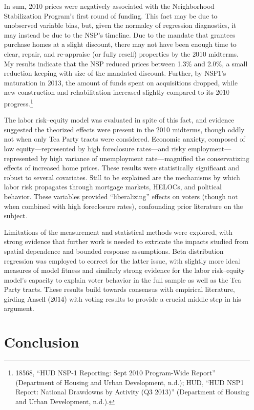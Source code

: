 \documentclass[12pt,oneside]{psthesis}
\begin{document}
In sum, 2010 prices were negatively associated with the Neighborhood Stabilization Program's first round of funding.
This fact may be due to unobserved variable bias, but, given the normalcy of regression diagnostics, it may instead be due to the NSP's timeline.
Due to the mandate that grantees purchase homes at a slight discount, there may not have been enough time to clear, repair, and re-appraise (or fully resell) properties by the 2010 midterms.
My results indicate that the NSP reduced prices between 1.3\% and 2.0\%, a small reduction keeping with size of the mandated discount.
Further, by NSP1's maturation in 2013, the amount of funds spent on acquisitions dropped, while new construction and rehabilitation increased slightly compared to its 2010 progress.\footnote{18568, ``HUD NSP-1 Reporting: Sept 2010 Program-Wide Report'' (Department of Housing and Urban Development, n.d.); HUD, ``HUD NSP1 Report: National Drawdowns by Activity (Q3 2013)'' (Department of Housing and Urban Development, n.d.).}

The labor risk--equity model was evaluated in spite of this fact, and evidence suggested the theorized effects were present in the 2010 midterms, though oddly not when only Tea Party tracts were considered.
Economic anxiety, composed of low equity---represented by high foreclosure rates---and risky employment---represented by high variance of unemployment rate---magnified the conservatizing effects of increased home prices.
These results were statistically significant and robust to several covariates.
Still to be explained are the mechanisms by which labor risk propagates through mortgage markets, HELOCs, and political behavior.
These variables provided ``liberalizing'' effects on voters (though not when combined with high foreclosure rates), confounding prior literature on the subject.

Limitations of the measurement and statistical methods were explored, with strong evidence that further work is needed to extricate the impacts studied from spatial dependence and bounded response assumptions.
Beta distribution regression was employed to correct for the latter issue, with slightly more ideal measures of model fitness and similarly strong evidence for the labor risk--equity model's capacity to explain voter behavior in the full sample as well as the Tea Party tracts.
These results build towards consensus with empirical literature, girding Ansell (2014) with voting results to provide a crucial middle step in his argument.

\hypertarget{conclusion}{%
\chapter{Conclusion}\label{conclusion}}
\end{document}
